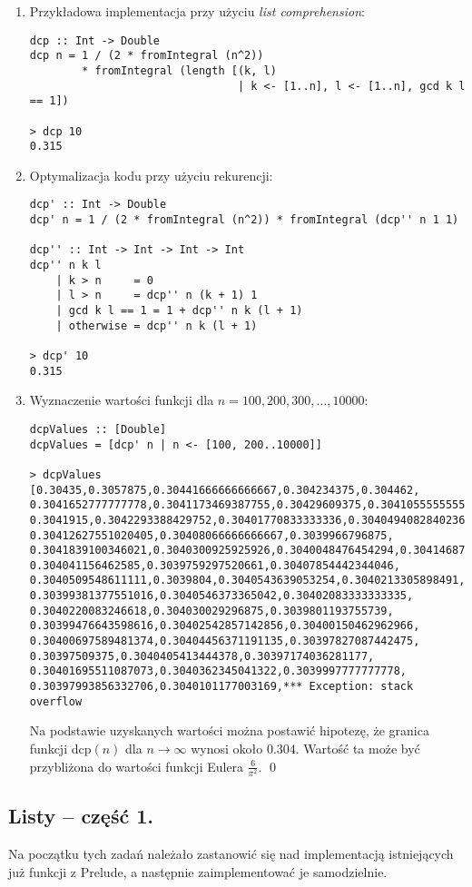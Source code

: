 \documentclass[11pt,a4paper]{article}
\begin{document}
\begin{enumerate}
    \item Przykładowa implementacja przy użyciu \textit{list comprehension}:
        \begin{Verbatim}[frame=single]
dcp :: Int -> Double
dcp n = 1 / (2 * fromIntegral (n^2))
        * fromIntegral (length [(k, l)
                                | k <- [1..n], l <- [1..n], gcd k l == 1])

> dcp 10
0.315
        \end{Verbatim}
    \item Optymalizacja kodu przy użyciu rekurencji:
        \begin{Verbatim}[frame=single]
dcp' :: Int -> Double
dcp' n = 1 / (2 * fromIntegral (n^2)) * fromIntegral (dcp'' n 1 1)

dcp'' :: Int -> Int -> Int -> Int
dcp'' n k l
    | k > n     = 0
    | l > n     = dcp'' n (k + 1) 1
    | gcd k l == 1 = 1 + dcp'' n k (l + 1)
    | otherwise = dcp'' n k (l + 1)

> dcp' 10
0.315
        \end{Verbatim}
    \item Wyznaczenie wartości funkcji dla \(n = 100, 200, 300, \dots, 10000\):
        \begin{Verbatim}[frame=single]
dcpValues :: [Double]
dcpValues = [dcp' n | n <- [100, 200..10000]]

> dcpValues
[0.30435,0.3057875,0.30441666666666667,0.304234375,0.304462,
0.3041652777777778,0.3041173469387755,0.30429609375,0.3041055555555556,
0.3041915,0.3042293388429752,0.30401770833333336,0.30404940828402366,
0.30412627551020405,0.30408066666666667,0.3039966796875,
0.3041839100346021,0.3040300925925926,0.3040048476454294,0.304146875,
0.304041156462585,0.3039759297520661,0.30407854442344046,
0.3040509548611111,0.3039804,0.3040543639053254,0.3040213305898491,
0.30399381377551016,0.3040546373365042,0.30402083333333335,
0.3040220083246618,0.304030029296875,0.3039801193755739,
0.30399476643598616,0.30402542857142856,0.30400150462962966,
0.30400697589481374,0.30404456371191135,0.30397827087442475,
0.30397509375,0.3040405413444378,0.30397174036281177,
0.30401695511087073,0.3040362345041322,0.3039997777777778,
0.30397993856332706,0.3040101177003169,*** Exception: stack overflow
        \end{Verbatim}
        Na podstawie uzyskanych wartości można postawić hipotezę, że granica funkcji \(\text{dcp}(n)\) dla \(n \to \infty\) wynosi około \(0.304\). Wartość ta może być przybliżona do wartości funkcji Eulera \(\frac{6}{\pi^2}\). \qed
\end{enumerate}

\subsection{Listy -- część 1.}
Na początku tych zadań należało zastanowić się nad implementacją istniejących już funkcji z Prelude, a następnie zaimplementować je samodzielnie.
\end{document}
